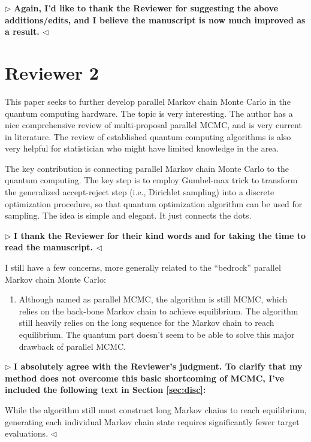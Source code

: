 \documentclass[12pt]{article}
\newenvironment{reply}{$\triangleright$\bfseries}{$\triangleleft$}
\renewenvironment{quote}
               {\list{}{\rightmargin\leftmargin}%
                \item\relax\normalfont}
               {\endlist}
\begin{document}
\begin{reply}
	Again, I'd like to thank the Reviewer for suggesting the above additions/edits, and I believe the manuscript is now much improved as a result.
\end{reply}


\section*{Reviewer 2}


This paper seeks to further develop parallel Markov chain Monte Carlo in the quantum computing hardware. The topic is very interesting. The author has a nice comprehensive review of multi-proposal parallel MCMC, and is very current in literature. The review of established quantum computing algorithms is also very helpful for statistician who might have limited knowledge in the area. 

The key contribution is connecting parallel Markov chain Monte Carlo to the quantum computing. The key step is to employ Gumbel-max trick to transform the generalized accept-reject step (i.e., Dirichlet sampling) into a discrete optimization procedure, so that quantum optimization algorithm can be used for sampling. The idea is simple and elegant. It just connects the dots.

\begin{reply}
	I thank the Reviewer for their kind words and for taking the time to read the manuscript.
\end{reply}

I still have a few concerns, more generally related to the “bedrock” parallel Markov chain Monte Carlo:

\begin{enumerate}
	\item Although named as parallel MCMC, the algorithm is still MCMC, which relies on the back-bone Markov chain to achieve equilibrium. The algorithm still heavily relies on the long sequence for the Markov chain to reach equilibrium. The quantum part doesn’t seem to be able to solve this major drawback of parallel MCMC. 
\end{enumerate}	

\begin{reply}
	I absolutely agree with the Reviewer's judgment.   To clarify that my method does not overcome this basic shortcoming of MCMC, I've included the following text in Section \ref{sec:disc}:
	\begin{quote}
		While the algorithm still must construct long Markov chains to reach equilibrium, generating each individual Markov chain state requires significantly fewer target evaluations.
	\end{quote} 
\end{reply}
	
\end{document}
